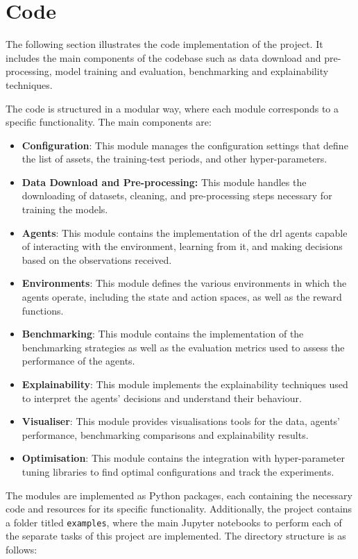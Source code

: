 \chapter{Code} \label{app:code}

The following section illustrates the code implementation of the project. It includes the main components of the codebase such as data download and pre-processing, model training and evaluation, benchmarking and explainability techniques. 

The code is structured in a modular way, where each module corresponds to a specific functionality. The main components are:
\begin{itemize}
    \item \textbf{Configuration}: This module manages the configuration settings that define the list of assets, the training-test periods, and other hyper-parameters.
    \item \textbf{Data Download and Pre-processing:} This module handles the downloading of datasets, cleaning, and pre-processing steps necessary for training the models.
    \item \textbf{Agents}: This module contains the implementation of the \acrshort{drl} agents capable of interacting with the environment, learning from it, and making decisions based on the observations received.
    \item \textbf{Environments}: This module defines the various environments in which the agents operate, including the state and action spaces, as well as the reward functions.
    \item \textbf{Benchmarking}: This module contains the implementation of the benchmarking strategies as well as the evaluation metrics used to assess the performance of the agents.
    \item \textbf{Explainability}: This module implements the explainability techniques used to interpret the agents' decisions and understand their behaviour.
    \item \textbf{Visualiser}: This module provides visualisations tools for the data, agents' performance, benchmarking comparisons and explainability results.
    \item \textbf{Optimisation}: This module contains the integration with hyper-parameter tuning libraries to find optimal configurations and track the experiments.
\end{itemize}

The modules are implemented as Python packages, each containing the necessary code and resources for its specific functionality. Additionally, the project contains a folder titled \texttt{examples}, where the main Jupyter notebooks to perform each of the separate tasks of this project are implemented. The directory structure is as follows:


